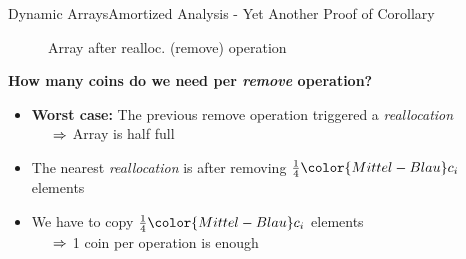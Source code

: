 
\begin{frame}{Dynamic Arrays}{Amortized Analysis -
    Yet Another Proof of Corollary}
  \vspace{-2.0em}
  \begin{figure}[!h]%
    \def\FSAsize{14}\def\FSAelements{0}%
    \def\FSAcopy{7}\def\FSAdelete{1}\def\FSAinsert{0}%
    \def\FSAcopyarrow{1}%
    \def\FSAinsertarrow{1}%
    \def\FSAlabelsize{\raisebox{1.75em}{$\begin{array}{c}
        {\color{Mittel-Blau}s_{i-1}-1}\\
        \text{old elements}
        \end{array}$}}%
    \def\FSAlabelinsertcapacity{removed elements}%
    \def\FSAlabelcapacity{${\color{Mittel-Blau}c_i}
      = \frac{1}{2} \cdot {\color{Mittel-Blau}c_{i-1}}$}%
    \vspace{-0.5em}%
    \caption{Array after realloc. (remove) operation}
    \label{fig:dynamic_fields:amortized_analysis:yapoc_array_shrink}
  \end{figure}
  \vspace*{-1.0em}
  \textbf{How many coins do we need per \textit{remove} operation?}
  \begin{itemize}
    \item
      \textbf{Worst case:}
      The previous remove operation triggered a \textit{reallocation}\\
      $\hspace{1.5em}\Rightarrow$ Array is half full
    \item
      The nearest \textit{reallocation} is after removing
      $\frac{1}{4} {\color{Mittel-Blau}c_i}$ elements
    \item
      We have to copy $\frac{1}{4} {\color{Mittel-Blau}c_i}$ elements\\
      $\hspace{1.5em}\Rightarrow$ 1 coin per operation is enough
  \end{itemize}
\end{frame}
